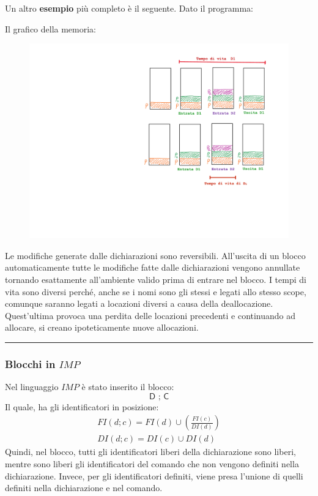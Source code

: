\documentclass[a4paper]{article}
\newcommand{\longline}{\noindent\rule{\textwidth}{0.4pt}}
\begin{document}
 	\noindent
 	Un altro \textcolor{Green4}{\textbf{esempio}} più completo è il seguente. Dato il programma:
 	
 	Il grafico della memoria:
 	\begin{figure}[!htp]
 		\centering
 		\includegraphics[width=\textwidth]{img/esempio-tempo_di_vita-2.pdf}
 	\end{figure}
 	
 	\noindent
 	Le modifiche generate dalle dichiarazioni sono reversibili. All'uscita di un blocco automaticamente tutte le modifiche fatte dalle dichiarazioni vengono annullate tornando esattamente all'ambiente valido prima di entrare nel blocco. I tempi di vita sono diversi perché, anche se i nomi sono gli stessi e legati allo stesso scope, comunque saranno legati a locazioni diversi a causa della deallocazione. Quest'ultima provoca una perdita delle locazioni precedenti e continuando ad allocare, si creano ipoteticamente nuove allocazioni.
 	
 	\longline
 	
 	\subsubsection{Blocchi in $IMP$}
 	
 	Nel linguaggio $IMP$ è stato inserito il blocco:
 	\begin{equation*}
 		\textsf{D ; C}
 	\end{equation*}
 	Il quale, ha gli identificatori in posizione:
 	\begin{equation*}
 		\begin{array}{lll}
 			FI\left(d;c\right) = FI\left(d\right) \cup \left(\frac{FI\left(c\right)}{DI\left(d\right)}\right)\\
 			DI\left(d;c\right) = DI\left(c\right) \cup DI\left(d\right)
 		\end{array}
 	\end{equation*}
 	Quindi, nel blocco, tutti gli identificatori liberi della dichiarazione sono liberi, mentre sono liberi gli identificatori del comando che non vengono definiti nella dichiarazione. Invece, per gli identificatori definiti, viene presa l'unione di quelli definiti nella dichiarazione e nel comando.\newline
 	
\end{document}
